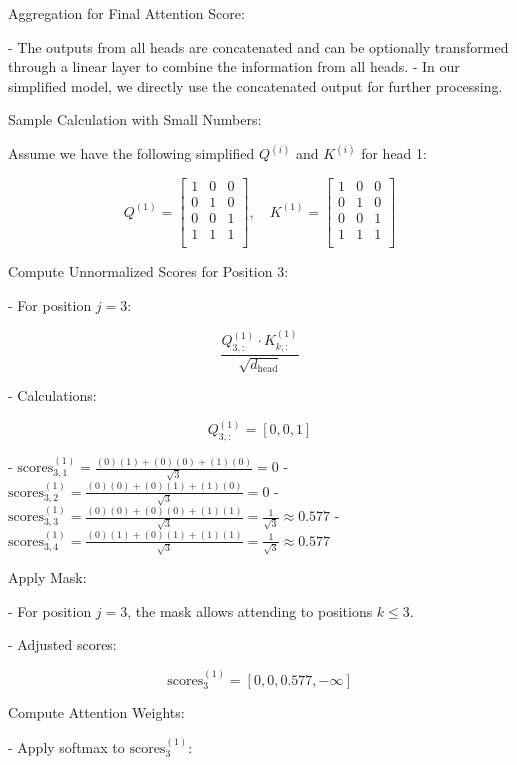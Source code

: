 \documentclass{article}
\begin{document}
Aggregation for Final Attention Score:

- The outputs from all heads are concatenated and can be optionally transformed through a linear layer to combine the information from all heads.
- In our simplified model, we directly use the concatenated output for further processing.

Sample Calculation with Small Numbers:

Assume we have the following simplified \( Q^{(i)} \) and \( K^{(i)} \) for head 1:

\[
Q^{(1)} = \begin{bmatrix}
    1 & 0 & 0 \\
    0 & 1 & 0 \\
    0 & 0 & 1 \\
    1 & 1 & 1 \\
\end{bmatrix},
\quad
K^{(1)} = \begin{bmatrix}
    1 & 0 & 0 \\
    0 & 1 & 0 \\
    0 & 0 & 1 \\
    1 & 1 & 1 \\
\end{bmatrix}
\]

Compute Unnormalized Scores for Position 3:

- For position \( j = 3 \):

  \[
\frac{Q^{(1)}_{3,:} \cdot K^{(1)}_{k,:}}{\sqrt{d_{\text{head}}}}
\]

- Calculations:

  \[
  Q^{(1)}_{3,:} = [0, 0, 1]
  \]

  - \( \text{scores}^{(1)}_{3,1} = \frac{(0)(1) + (0)(0) + (1)(0)}{\sqrt{3}} = 0 \)
  - \( \text{scores}^{(1)}_{3,2} = \frac{(0)(0) + (0)(1) + (1)(0)}{\sqrt{3}} = 0 \)
  - \( \text{scores}^{(1)}_{3,3} = \frac{(0)(0) + (0)(0) + (1)(1)}{\sqrt{3}} = \frac{1}{\sqrt{3}} \approx 0.577 \)
  - \( \text{scores}^{(1)}_{3,4} = \frac{(0)(1) + (0)(1) + (1)(1)}{\sqrt{3}} = \frac{1}{\sqrt{3}} \approx 0.577 \)

Apply Mask:

- For position \( j = 3 \), the mask allows attending to positions \( k \leq 3 \).

- Adjusted scores:

  \[
  \text{scores}^{(1)}_{3} = [0, 0, 0.577, -\infty]
  \]

Compute Attention Weights:

- Apply softmax to \( \text{scores}^{(1)}_{3} \):
\end{document}
